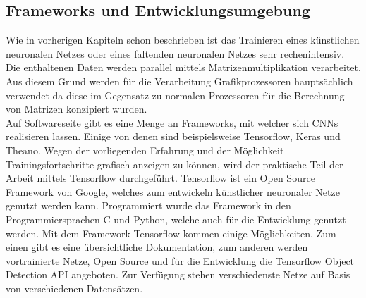 \documentclass[a4paper,12pt,oneside]{article}
\begin{document}
\subsection{Frameworks und Entwicklungsumgebung}\label{s.entwicklung}
Wie in vorherigen Kapiteln schon beschrieben ist das Trainieren eines künstlichen neuronalen Netzes oder eines faltenden neuronalen Netzes sehr rechenintensiv. Die enthaltenen Daten werden parallel mittels Matrizenmultiplikation verarbeitet. Aus diesem Grund werden für die Verarbeitung Grafikprozessoren hauptsächlich verwendet da diese im Gegensatz zu normalen Prozessoren für die Berechnung von Matrizen konzipiert wurden.\\
Auf Softwareseite gibt es eine Menge an Frameworks, mit welcher sich CNNs realisieren lassen. Einige von denen sind beispielsweise Tensorflow, Keras und Theano. Wegen der vorliegenden Erfahrung und der Möglichkeit Trainingsfortschritte grafisch anzeigen zu können, wird der praktische Teil der Arbeit mittels Tensorflow durchgeführt. Tensorflow ist ein Open Source Framework von Google, welches zum entwickeln künstlicher neuronaler Netze genutzt werden kann. Programmiert wurde das Framework in den Programmiersprachen C und Python, welche auch für die Entwicklung genutzt werden. Mit dem Framework Tensorflow kommen einige Möglichkeiten. Zum einen gibt es eine übersichtliche Dokumentation, zum anderen werden vortrainierte Netze, Open Source und für die Entwicklung die Tensorflow Object Detection API angeboten. Zur Verfügung stehen verschiedenste Netze auf Basis von verschiedenen Datensätzen.
\end{document}
